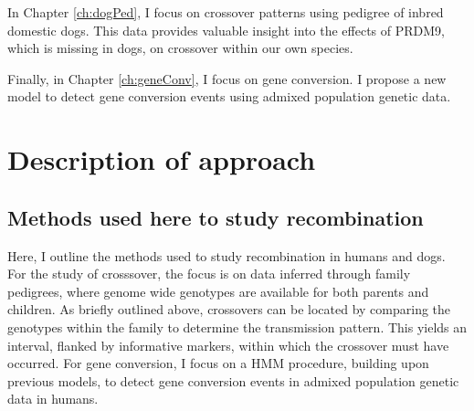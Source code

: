 In Chapter \ref{ch:dogPed}, I focus on crossover patterns using pedigree of inbred domestic dogs.
This data provides valuable insight into the effects of PRDM9, which is missing in dogs, on crossover within our own species.

Finally, in Chapter \ref{ch:geneConv}, I focus on gene conversion.
I propose a new model to detect gene conversion events using admixed population genetic data.



\section{Description of approach}

\subsection{Methods used here to study recombination}
Here, I outline the methods used to study recombination in humans and dogs.
For the study of crosssover, the focus is on data inferred through family pedigrees, where genome wide genotypes are available for both parents and children.
As briefly outlined above, crossovers can be located by comparing the genotypes within the family to determine the transmission pattern.
This yields an interval, flanked by informative markers, within which the crossover must have occurred.
For gene conversion, I focus on a HMM procedure, building upon previous models, to detect gene conversion events in admixed population genetic data in humans.


